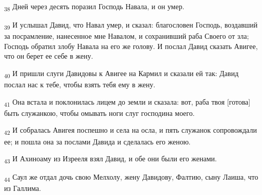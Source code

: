 \begin{tcolorbox}
\textsubscript{38} Дней через десять поразил Господь Навала, и он умер.
\end{tcolorbox}
\begin{tcolorbox}
\textsubscript{39} И услышал Давид, что Навал умер, и сказал: благословен Господь, воздавший за посрамление, нанесенное мне Навалом, и сохранивший раба Своего от зла; Господь обратил злобу Навала на его же голову. И послал Давид сказать Авигее, что он берет ее себе в жену.
\end{tcolorbox}
\begin{tcolorbox}
\textsubscript{40} И пришли слуги Давидовы к Авигее на Кармил и сказали ей так: Давид послал нас к тебе, чтобы взять тебя ему в жену.
\end{tcolorbox}
\begin{tcolorbox}
\textsubscript{41} Она встала и поклонилась лицем до земли и сказала: вот, раба твоя [готова] быть служанкою, чтобы омывать ноги слуг господина моего.
\end{tcolorbox}
\begin{tcolorbox}
\textsubscript{42} И собралась Авигея поспешно и села на осла, и пять служанок сопровождали ее; и пошла она за послами Давида и сделалась его женою.
\end{tcolorbox}
\begin{tcolorbox}
\textsubscript{43} И Ахиноаму из Изрееля взял Давид, и обе они были его женами.
\end{tcolorbox}
\begin{tcolorbox}
\textsubscript{44} Саул же отдал дочь свою Мелхолу, жену Давидову, Фалтию, сыну Лаиша, что из Галлима.
\end{tcolorbox}
